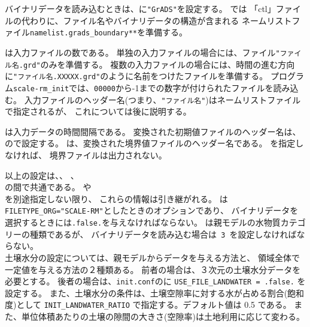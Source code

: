 バイナリデータを読み込むときは、に\verb|"GrADS"|を設定する。
\scalerm では 「ctl」ファイルの代わりに、ファイル名やバイナリデータの構造が含まれる
ネームリストファイル\verb|namelist.grads_boundary**|を準備する。

は入力ファイルの数である。
単独の入力ファイルの場合には、ファイル\verb|"ファイル名.grd"|のみを準備する。
複数の入力ファイルの場合には、時間の進む方向に\verb|"ファイル名.XXXXX.grd"|のように名前をつけたファイルを準備する。
プログラム\verb|scale-rm_init|では、\verb|00000|から-1までの数字が付けられたファイルを読み込む。
入力ファイルのヘッダー名(つまり、\verb|"ファイル名"|)はネームリストファイルで指定されるが、
これについては後に説明する。

は入力データの時間間隔である。
変換された初期値ファイルのヘッダー名は、ので設定する。
は、変換された境界値ファイルのヘッダー名である。
を指定しなければ、 境界ファイルは出力されない。

以上の設定は、、
、\\ 
の間で共通である。
や \\
を別途指定しない限り、
これらの情報は引き継がれる。
%
は\verb|FILETYPE_ORG="SCALE-RM"|としたときのオプションであり、
バイナリデータを選択するときには\verb|.false.|を与えなければならない。
は親モデルの水物質カテゴリーの種類であるが、
バイナリデータを読み込む場合は\verb| 3 |を設定しなければならない。\\

土壌水分の設定については、親モデルからデータを与える方法と、
領域全体で一定値を与える方法の２種類ある。
前者の場合は、３次元の土壌水分データを必要とする。
後者の場合は、\verb|init.conf|のに
\verb|USE_FILE_LANDWATER = .false.| を設定する。
また、土壌水分の条件は、土壌空隙率に対する水が占める割合(飽和度)として
\verb|INIT_LANDWATER_RATIO| で指定する。デフォルト値は 0.5 である。
また、単位体積あたりの土壌の隙間の大きさ(空隙率)は土地利用に応じて変わる。\\

